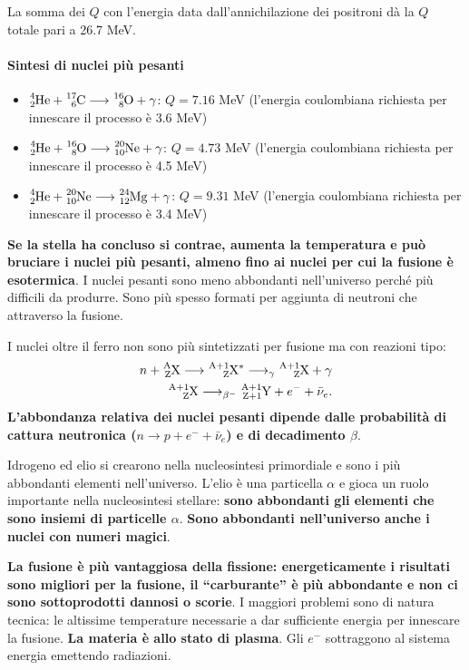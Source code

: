 \documentclass[a4paper,11pt,twoside,openany]{book}
\theoremstyle{definition}
\theoremstyle{plain}
\theoremstyle{plain}
\theoremstyle{definition}
\begin{document}
La somma dei $Q$ con l'energia data dall'annichilazione dei positroni dà la $Q$ totale pari a 26.7 MeV.

\paragraph{Sintesi di nuclei più pesanti}
\begin{itemize}
\item $\ce{^{4}_{2}He}+\ce{^{17}_{6}C}\longrightarrow \ce{^{16}_{8}O}+\gamma$: $Q=7.16$ MeV (l'energia coulombiana richiesta per innescare il processo è 3.6 MeV)
\item $\ce{^{4}_{2}He}+\ce{^{16}_{8}O}\longrightarrow \ce{^{20}_{10}Ne}+\gamma$: $Q=4.73$ MeV (l'energia coulombiana richiesta per innescare il processo è 4.5 MeV)
\item $\ce{^{4}_{2}He}+\ce{^{20}_{10}Ne}\longrightarrow \ce{^{24}_{12}Mg}+\gamma$: $Q=9.31$ MeV (l'energia coulombiana richiesta per innescare il processo è 3.4 MeV)
\end{itemize}
\textbf{Se la stella ha concluso  si contrae, aumenta la temperatura e può bruciare i nuclei più pesanti, almeno fino ai nuclei per cui la fusione è esotermica}. I nuclei pesanti sono meno abbondanti nell'universo perché più difficili da produrre. Sono più spesso formati per aggiunta di neutroni che attraverso la fusione.

I nuclei oltre il ferro non sono più sintetizzati per fusione ma con reazioni tipo:
\begin{equation}\begin{split}
n+\ce{^A_ZX}\longrightarrow \ce{^{A+1}_ZX}^*\longrightarrow_{\gamma} \ce{^{A+1}_ZX}+\gamma\\
\ce{^{A+1}_ZX}\longrightarrow_{\beta^-} \ce{^{A+1}_{Z+1}Y}+e^-+\bar\nu_e.
\end{split}\end{equation}
\textbf{L'abbondanza relativa dei nuclei pesanti dipende dalle probabilità di cattura neutronica ($n\longrightarrow p+e^-+\bar\nu_e$) e di decadimento $\beta$}.

Idrogeno ed elio si crearono nella nucleosintesi primordiale e sono i più abbondanti elementi nell'universo. L'elio è una particella $\alpha$ e gioca un ruolo importante nella nucleosintesi stellare: \textbf{sono abbondanti gli elementi che sono insiemi di particelle $\alpha$}. \textbf{Sono abbondanti nell'universo anche i nuclei con numeri magici}.

\textbf{La fusione è più vantaggiosa della fissione: energeticamente i risultati sono migliori per la fusione, il ``carburante'' è più abbondante e non ci sono sottoprodotti dannosi o scorie}. I maggiori problemi sono di natura tecnica: le altissime temperature necessarie a dar sufficiente energia per innescare la fusione. \textbf{La materia è allo stato di plasma}. Gli $e^-$ sottraggono al sistema energia emettendo radiazioni.
\end{document}
